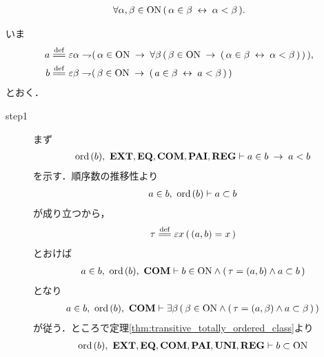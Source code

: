 	\begin{screen}
		\begin{thm}
		\label{thm:element_and_proper_subset_correspond}
			\begin{align}
				\forall \alpha,\beta \in \mathrm{ON}\,
				(\, \alpha \in \beta \hspace{0.25em}\leftrightarrow\hspace{0.25em} \alpha < \beta\, ).
			\end{align}
		\end{thm}
	\end{screen}
	
	\begin{prf}
		いま
		\begin{align}
			a &\defeq \varepsilon \alpha \negation 
			(\, \alpha \in \ON \rarrow \forall \beta\, (\, \beta \in \ON \rarrow 
			(\, \alpha \in \beta \lrarrow \alpha < \beta\, )\,) \,), \\
			b &\defeq \varepsilon \beta \negation (\, \beta \in \ON \rarrow 
			(\, a \in \beta \lrarrow a < \beta\, )\,)
		\end{align}
		とおく．
		\begin{description}
			\item[step1] まず
				\begin{align}
					\operatorname*{ord}\hspace{0.15em}(b),\ \mbox{{\bf EXT}},\mbox{{\bf EQ}},\mbox{\bf COM},\mbox{{\bf PAI}},\mbox{{\bf REG}} \vdash 
					a \in b \hspace{0.25em}\rightarrow\hspace{0.25em} a < b
				\end{align}
				を示す．順序数の推移性より
				\begin{align}
					a \in b,\ \operatorname*{ord}\hspace{0.15em}(b) \vdash a \subset b
					\label{fom:element_and_proper_subset_correspond_1}
				\end{align}
				が成り立つから，
				\begin{align}
					\tau \defeq \varepsilon x\, (\, (a,b) = x\, )
				\end{align}
				とおけば
				\begin{align}
					a \in b,\ \operatorname*{ord}\hspace{0.15em}(b),\ \mbox{\bf COM} 
					\vdash b \in \mathrm{ON} \wedge (\, \tau = (a,b) \wedge a \subset b\, )
				\end{align}
				となり
				\begin{align}
					a \in b,\ \operatorname*{ord}\hspace{0.15em}(b),\ \mbox{\bf COM}  
					\vdash \exists \beta\, (\, \beta \in \mathrm{ON} \wedge 
					(\, \tau = (a,\beta) \wedge a \subset \beta\, )\, )
					\label{fom:element_and_proper_subset_correspond_2}
				\end{align}
				が従う．ところで定理\ref{thm:transitive_totally_ordered_class}より
				\begin{align}
					\operatorname*{ord}\hspace{0.15em}(b),\ \mbox{{\bf EXT}},\mbox{{\bf EQ}},\mbox{\bf COM},\mbox{{\bf PAI}},\mbox{{\bf UNI}},\mbox{{\bf REG}} \vdash 
					b \subset \mathrm{ON}
				\end{align}

\end{description}
\end{prf}
